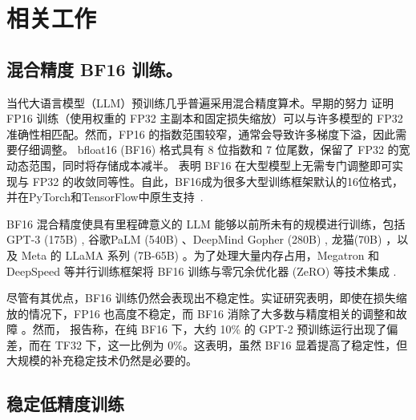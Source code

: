 \documentclass{article} %
\begin{document}

\nocite{*} %



\newpage
\appendix


\section{相关工作}


\subsection{混合精度 BF16 训练。}  
当代大语言模型（LLM）预训练几乎普遍采用混合精度算术。早期的努力 \citet{micikevicius2017mixed} 证明 FP16 训练（使用权重的 FP32 主副本和固定损失缩放）可以与许多模型的 FP32 准确性相匹配。然而，FP16 的指数范围较窄，通常会导致许多梯度下溢，因此需要仔细调整。 bfloat16 (BF16) 格式具有 8 位指数和 7 位尾数，保留了 FP32 的宽动态范围，同时将存储成本减半。 \citet{kalamkar2019study} 表明 BF16 在大型模型上无需专门调整即可实现与 FP32 的收敛同等性。自此，BF16成为很多大型训练框架默认的16位格式，并在PyTorch和TensorFlow中原生支持~\citep{wang2019bfloat16}. 

BF16 混合精度使具有里程碑意义的 LLM 能够以前所未有的规模进行训练，包括 GPT-3 (175B) \citep{brown2020language}, 谷歌PaLM (540B) \citep{chowdhery2023palm}、DeepMind Gopher (280B) \citep{rae2021scaling}, 龙猫(70B) \citep{hoffmann2022training}，以及 Meta 的 LLaMA 系列 (7B-65B) \citep{touvron2023llama}。为了处理大量内存占用，Megatron 和 DeepSpeed 等并行训练框架将 BF16 训练与零冗余优化器 (ZeRO) 等技术集成 \citep{rajbhandari2020zero}.

尽管有其优点，BF16 训练仍然会表现出不稳定性。实证研究表明，即使在损失缩放的情况下，FP16 也高度不稳定，而 BF16 消除了大多数与精度相关的调整和故障 \cite{wang2019bfloat16}。然而， \citet{lee2024fp8} 报告称，在纯 BF16 下，大约 10\% 的 GPT-2 预训练运行出现了偏差，而在 TF32 下，这一比例为 0\%。这表明，虽然 BF16 显着提高了稳定性，但大规模的补充稳定技术仍然是必要的。 

\subsection{稳定低精度训练}
\end{document}
